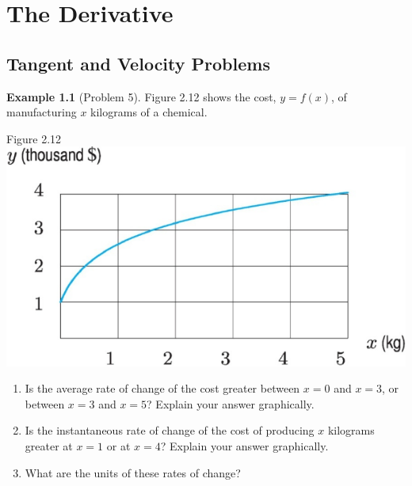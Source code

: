 \documentclass[oneside]{book}
\theoremstyle{definition}
\newtheorem{example}{Example}
\theoremstyle{solution}
\begin{document}
\chapter{The Derivative}
\section{Tangent and Velocity Problems}

\begin{example}[Problem 5]
Figure 2.12 shows the cost, $y = f(x)$, of manufacturing $x$ kilograms
of a chemical. 

\begin{center}
 {\large Figure 2.12}\\
  \includegraphics{Images/s2-1prob5.pdf}
\end{center}

\begin{enumerate}
\item Is the average rate of change of the cost greater between
  $x = 0$ and $x = 3$, or between $x = 3$ and $x = 5$? Explain your
  answer graphically.
\item Is the instantaneous rate of change of the cost of producing $x$
  kilograms greater at $x = 1$ or at $x = 4$? Explain your answer
  graphically.
\item What are the units of these rates of change?
\end{enumerate}
\end{example}
\end{document}
